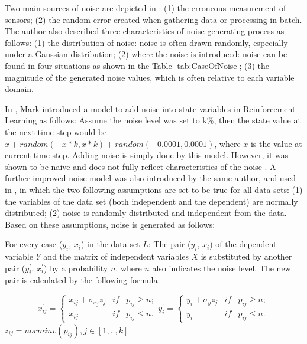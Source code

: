 Two main sources of noise are depicted in \cite{2010Dav}: (1) the erroneous measurement of sensors; (2) the random error created when gathering data or processing in batch. The author also described three characteristics of noise generating process as follows: (1) the distribution of noise: noise is often drawn randomly, especially under a Gaussian distribution; (2) where the noise is introduced: noise can be found in four situations as shown in the Table \ref{tab:CaseOfNoise}; (3) the magnitude of the generated noise values, which is often relative to each variable domain.\par

In \cite{1994Mark}, Mark introduced a model to add noise into state variables in Reinforcement Learning as follows: Assume the noise level was set to k\%, then the state value at the next time step  would be $x + random (-x*k,x*k) + random(-0.0001,0.0001)$, where $x$ is the value at current time step. Adding noise is simply done by this model. However, it was shown to be naive and does not fully reflect characteristics of the noise \cite{1994Mark}. A further improved noise model was also introduced by the same author, and  used in \cite{2003Eli}, in which the two following assumptions are set to be true for all data sets: (1) the variables of the data set (both independent and the dependent) are normally distributed; (2) noise is randomly distributed and independent from the data. Based on these assumptions, noise is generated as follows: \par

For every case ($y_{i}$, $x_{i}$) in the data set $L$: The pair ($y_{i}$, $x_{i}$) of the dependent variable $Y$ and the matrix of independent variables $X$ is substituted by another pair ($y_{i}^{'}$, $x_{i}^{'}$) by a probability $n$, where $n$ also indicates the noise level. The new pair is calculated by the following formula:

$$ x_{ij}^{'} = \left\{ \begin{array}{lll}
x_{ij}+\sigma_{x_{j}}z_{j} & if & p_{ij}\geq n ;\\
x_{ij} & if & p_{ij} \le n .\end{array} \right.
y_{i}^{'} = \left\{ \begin{array}{lll}
y_{i}+\sigma_{y}z_{j} &  if & p_{ij}\geq n ;\\
y_{i} &if &p_{ij} \le n .\end{array} \right. $$
$z_{ij} =norminv(p_{ij}),j\in [1,..,k]$ \par

